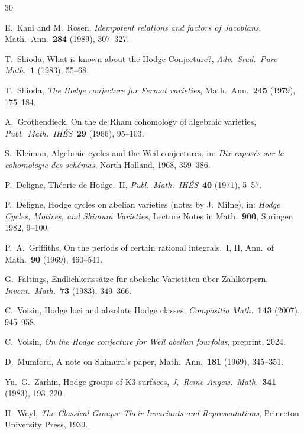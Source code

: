 \documentclass[11pt]{article}
\theoremstyle{plain}
\theoremstyle{definition}
\theoremstyle{remark}
\begin{document}
\begin{thebibliography}{30}

E.~Kani and M.~Rosen,
\emph{Idempotent relations and factors of Jacobians},
Math.\ Ann.\ \textbf{284} (1989), 307--327.

T.~Shioda,
What is known about the Hodge Conjecture?,
\emph{Adv.\ Stud.\ Pure Math.}\ \textbf{1} (1983), 55--68.

T.~Shioda,
\emph{The Hodge conjecture for Fermat varieties},
Math.\ Ann.\ \textbf{245} (1979), 175--184.

A.~Grothendieck,
On the de Rham cohomology of algebraic varieties,
\emph{Publ.\ Math.\ IH\'ES}\ \textbf{29} (1966), 95--103.

S.~Kleiman,
Algebraic cycles and the Weil conjectures,
in: \emph{Dix expos\'es sur la cohomologie des sch\'emas},
North-Holland, 1968, 359--386.

P.~Deligne,
Th\'eorie de Hodge.\ II,
\emph{Publ.\ Math.\ IH\'ES}\ \textbf{40} (1971), 5--57.

P.~Deligne,
Hodge cycles on abelian varieties (notes by J.~Milne),
in: \emph{Hodge Cycles, Motives, and Shimura Varieties},
Lecture Notes in Math.\ \textbf{900}, Springer, 1982, 9--100.

P.~A.~Griffiths,
On the periods of certain rational integrals.\ I, II,
Ann.\ of Math.\ \textbf{90} (1969), 460--541.

G.~Faltings,
Endlichkeitss\"atze f\"ur abelsche Variet\"aten \"uber Zahlk\"orpern,
\emph{Invent.\ Math.}\ \textbf{73} (1983), 349--366.

C.~Voisin,
Hodge loci and absolute Hodge classes,
\emph{Compositio Math.}\ \textbf{143} (2007), 945--958.

C.~Voisin,
\emph{On the Hodge conjecture for Weil abelian fourfolds},
preprint, 2024.

D.~Mumford,
A note on Shimura's paper,
Math.\ Ann.\ \textbf{181} (1969), 345--351.

Yu.~G.~Zarhin,
Hodge groups of K3 surfaces,
\emph{J.~Reine Angew.\ Math.}\ \textbf{341} (1983), 193--220.

H.~Weyl,
\emph{The Classical Groups: Their Invariants and Representations},
Princeton University Press, 1939.


\end{thebibliography}
\end{document}
